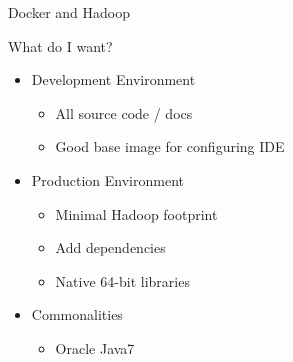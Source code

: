 \documentclass[xcolor=dvipsnames]{beamer}
\begin{document}
\begin{frame}{Docker and Hadoop}

  What do I want?
  \begin{itemize}
  \item Development Environment
    \begin{itemize}
    \item All source code / docs
    \item Good base image for configuring IDE
    \end{itemize}
  \item Production Environment
    \begin{itemize}
    \item Minimal Hadoop footprint
    \item Add dependencies
    \item Native 64-bit libraries
    \end{itemize}
  \item Commonalities
    \begin{itemize}
    \item Oracle Java7
    \end{itemize}
  \end{itemize}

\end{frame}

\end{document}
